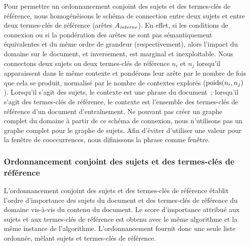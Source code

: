         Pour permettre un ordonnancement conjoint des sujets et des termes-clés
        de référence, nous homogénéisons le schéma de connection entre deux
        sujets et entre deux termes-clés de référence (arêtes
        $A_\textnormal{\textit{interne}}$). En effet, si les conditions de
        connexion ou si la pondération des arêtes ne sont pas sémantiquement
        équivalentes et du même ordre de grandeur (respectivement), alors
        l'impact du domaine sur le document, et inversement, est marginal et
        inexploitable. Nous connectons deux sujets ou deux termes-clés de
        référence $n_i$ et $n_j$ lorsqu'il apparaissent dans le même contexte et
        pondérons leur arête par le nombre de fois que cela se produit,
        normalisé par le nombre de contextes explorés ($\textnormal{poids}(n_i,
        n_j)$). Lorsqu'il s'agit des sujets, le contexte est une phrase du
        document~; lorsqu'il
        s'agit des termes-clés de référence, le contexte est l'ensemble des
        termes-clés de référence d'un document d'entraînement. Ne pouvant pas
        créer un graphe complet du domaine à partir de ce schéma de connexion,
        nous n'utilisons pas un graphe complet pour le graphe de sujets. Afin
        d'éviter d'utiliser une valeur pour la fenêtre de cooccurrences, nous
        difinissons la phrase comme fenêtre.

      \subsubsection{Ordonnancement conjoint des sujets et des termes-clés de référence}
      \label{subsubsec:main-automatic_keyphrase_annotation-supervised_automatic_keyphrase_extraction-topiccorank-co_ranking}
        L'ordonnancement conjoint des sujets et des termes-clés de référence
        établit l'ordre d'importance des sujets du document et des termes-clés
        de référence du domaine vis-à-vis du contenu du document. Le score
        d'importance attribué aux sujets et aux termes-clés de référence est
        obtenu avec le même algorithme et la même instance de l'algorithme.
        L'ordonnancement fournit donc une seule liste ordonnée, mêlant sujets et
        termes-clés de référence.


